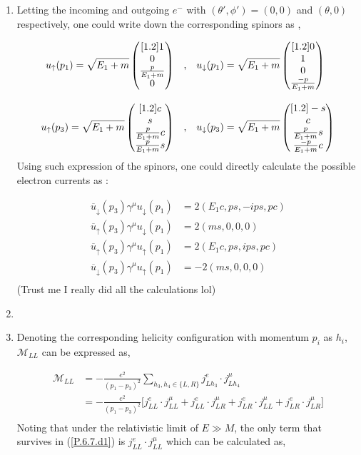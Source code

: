 \begin{solution}
\begin{enumerate}[label=(\alph*)]
        \item Letting the incoming and outgoing $e^-$ with $\left(\theta',\phi'\right)=(0,0)$ and $(\theta,0)$ respectively, one could write down the corresponding spinors as ,
        
        \begin{align*}
            u_\uparrow (p_1) = \sqrt{E_1+m} \begin{pmatrix}[1.2] 1 \\ 0 \\ \frac{p}{E_1+m} \\ 0\end{pmatrix} &\quad \text{,} \quad u_\downarrow (p_1) = \sqrt{E_1+m} \begin{pmatrix}[1.2] 0 \\ 1 \\ 0 \\ \frac{-p}{E_1+m}\end{pmatrix} \\[0.12in]
            u_\uparrow (p_3) = \sqrt{E_1+m} \begin{pmatrix}[1.2] c \\ s \\ \frac{p}{E_1+m}c \\ \frac{p}{E_1+m}s\end{pmatrix} &\quad \text{,} \quad u_\downarrow (p_3) = \sqrt{E_1+m} \begin{pmatrix}[1.2] -s \\ c \\ \frac{p}{E_1+m}s \\ \frac{-p}{E_1+m}c\end{pmatrix} \\
        \end{align*}
        Using such expression of the spinors, one could directly calculate the possible electron currents as : 

        \begin{align*}
            \overbar{u}_\downarrow(p_3)\gamma^\mu u_\downarrow(p_1) &= 2 (E_1 c , ps,-ips, pc) \\
            \overbar{u}_\uparrow(p_3)\gamma^\mu u_\downarrow(p_1)   &= 2 (ms,0,0,0) \\
            \overbar{u}_\uparrow(p_3)\gamma^\mu u_\uparrow(p_1) &= 2 (E_1 c, ps ,ips,pc) \\
            \overbar{u}_\downarrow(p_3)\gamma^\mu u_\uparrow(p_1) &= -2 (ms,0,0,0) \\
        \end{align*}
        (Trust me I really did all the calculations lol)

        \item 

        \item Denoting the corresponding helicity configuration with momentum $p_i$ as $h_i$, $\mathcal{M}_{LL}$ can be expressed as, 

            \begin{align}
                \mathcal{M}_{LL} &= -\frac{e^2}{(p_1-p_3)^2} \sum_{h_3,h_4 \in \{L,R\}} j^e_{Lh_3} \cdot j^\mu_{Lh_4} \nonumber \\[0.125in]  \label{P.6.7.d1}
                &=  -\frac{e^2}{(p_1-p_3)^2} \big[ j^e_{LL}\cdot j^\mu_{LL}+ j^e_{LL}\cdot j^\mu_{LR} + j^e_{LR}\cdot j^\mu_{LL} + j^e_{LR}\cdot j^\mu_{LR} \big] \\ \nonumber
            \end{align}
        Noting that under the relativistic limit of $E\gg M$, the only term that survives in (\ref{P.6.7.d1}) is $j^e_{LL}\cdot j^\mu_{LL}$ which can be calculated as,


\end{enumerate}
\end{solution}
